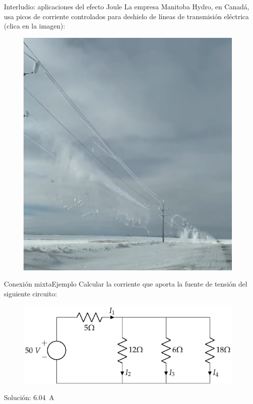 \documentclass[aspectratio=169, xcolor={usenames,svgnames,dvipsnames}]{beamer}
\begin{document}

\begin{frame}{Interludio: \hspace{3mm}aplicaciones del efecto Joule}
    \vspace{1mm}
    La empresa Manitoba Hydro, en Canadá, usa picos de corriente controlados para deshielo de líneas de transmisión eléctrica (\alert{clica en la imagen}):
		\begin{figure}[H]
			\centering
			\href{https://twitter.com/manitobahydro/status/1616529065879666688?t=zpgrdypQRYD2SJVQbOHkeg&s=19}{\includegraphics[width=.39\linewidth]{../figs/Joule_Manitoba.png}}
		\end{figure}
\end{frame}


\begin{frame}{Conexión mixta}{Ejemplo}
    \vspace{5mm}
    Calcular la corriente que aporta la fuente de tensión del siguiente circuito:
		\begin{figure}[H]
			\centering
			\includegraphics{../figs/ej1_BT1.pdf}
		\end{figure}
    \vspace{5mm}
    \alert{Solución}: \qty{6.04}{\ampere}
\end{frame}

\end{document}
